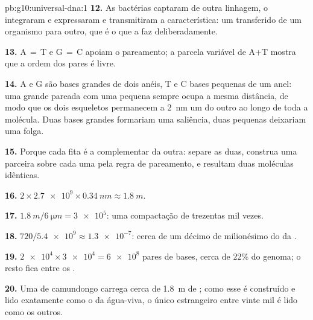 \begin{solution}{pb:g10:universal-dna:1}
\textbf{12.} As bactérias captaram  de outra linhagem, o integraram
e expressaram e transmitiram a característica: um  transferido de
um organismo para outro, que é o que a  faz deliberadamente.

\textbf{13.} A$\,=\,$T e G$\,=\,$C apoiam o pareamento; a parcela
variável de A+T mostra que a ordem dos pares é livre.

\textbf{14.} A e G são bases grandes de dois anéis, T e C bases
pequenas de um anel: uma grande pareada com uma pequena sempre ocupa a
mesma distância, de modo que os dois esqueletos permanecem a
\qty{2}{nm} um do outro ao longo de toda a molécula. Duas bases grandes
formariam uma saliência, duas pequenas deixariam uma folga.

\textbf{15.} Porque cada fita é a complementar da outra: separe as
duas, construa uma parceira sobre cada uma pela regra de pareamento, e
resultam duas moléculas idênticas.

\textbf{16.} $2 \times \num{2.7e9} \times \qty{0.34}{nm} \approx
\qty{1.8}{m}$.

\textbf{17.} $\qty{1.8}{m} / \qty{6}{\micro m} = \num{3e5}$: uma
compactação de trezentas mil vezes.

\textbf{18.} $720 / \num{5.4e9} \approx \num{1.3e-7}$: cerca de um
décimo de milionésimo do  da .

\textbf{19.} $\num{2e4} \times \num{3e4} = \num{6e8}$ pares de bases,
cerca de 22\% do genoma; o resto fica entre os .

\textbf{20.} Uma  de camundongo carrega cerca de \qty{1.8}{m} de
; como esse  é construído e lido exatamente como o da água-viva, o
único  estrangeiro entre vinte mil é lido como os outros.
\end{solution}
